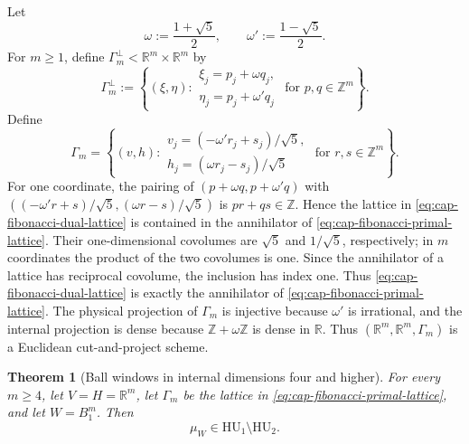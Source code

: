 \documentclass[11pt,reqno,a4paper]{amsart}
\numberwithin{equation}{section}
\theoremstyle{compact}
\newtheorem{theorem}{Theorem}[section]
\theoremstyle{definition}
\theoremstyle{definition}
\newcommand{\HU}{\mathrm{HU}}
\begin{document}
Let
\begin{equation}\label{eq:cap-golden-ratios}
  \omega:=\frac{1+\sqrt5}{2},
  \qquad
  \omega':=\frac{1-\sqrt5}{2}.
\end{equation}
For \(m\geq1\), define
\(\Gamma_m^\perp<\mathbb R^m\times\mathbb R^m\) by
\begin{equation}\label{eq:cap-fibonacci-dual-lattice}
  \Gamma_m^\perp
  :=\left\{(\xi,\eta):
    \begin{array}{l}
      \xi_j=p_j+\omega q_j,\\
      \eta_j=p_j+\omega' q_j
    \end{array}
    \text{ for }p,q\in\mathbb Z^m
  \right\}.
\end{equation}
Define
\begin{equation}\label{eq:cap-fibonacci-primal-lattice}
  \Gamma_m
  =\left\{(v,h):
    \begin{array}{l}
      v_j=(-\omega' r_j+s_j)/\sqrt5,\\
      h_j=(\omega r_j-s_j)/\sqrt5
    \end{array}
    \text{ for }r,s\in\mathbb Z^m
  \right\}.
\end{equation}
For one coordinate, the pairing of
$(p+\omega q,p+\omega' q)$ with
$((-\omega' r+s)/\sqrt5,(\omega r-s)/\sqrt5)$ is
$p r+q s\in\mathbb Z$.  Hence the lattice in
\eqref{eq:cap-fibonacci-dual-lattice} is contained in the annihilator of
\eqref{eq:cap-fibonacci-primal-lattice}.  Their one-dimensional covolumes are
$\sqrt5$ and $1/\sqrt5$, respectively; in $m$ coordinates the product of the
two covolumes is one.  Since the annihilator of a lattice has reciprocal
covolume, the inclusion has index one.  Thus
\eqref{eq:cap-fibonacci-dual-lattice} is exactly the annihilator of
\eqref{eq:cap-fibonacci-primal-lattice}.  The physical projection of
$\Gamma_m$ is injective because $\omega'$ is irrational, and the internal
projection is dense because $\mathbb Z+\omega\mathbb Z$ is dense in
$\mathbb R$.  Thus
$(\mathbb R^m,\mathbb R^m,\Gamma_m)$ is a Euclidean cut-and-project scheme.

\begin{theorem}[Ball windows in internal dimensions four and higher]
\label{thm:cap-four-dimensional-obstruction}
For every \(m\geq4\), let \(V=H=\mathbb R^m\), let \(\Gamma_m\) be the
lattice in \eqref{eq:cap-fibonacci-primal-lattice}, and let \(W=B_1^m\).
Then
\begin{equation}\label{eq:cap-four-dimensional-separation}
  \mu_W\in\HU_1\setminus\HU_2.
\end{equation}
\end{theorem}
\end{document}
